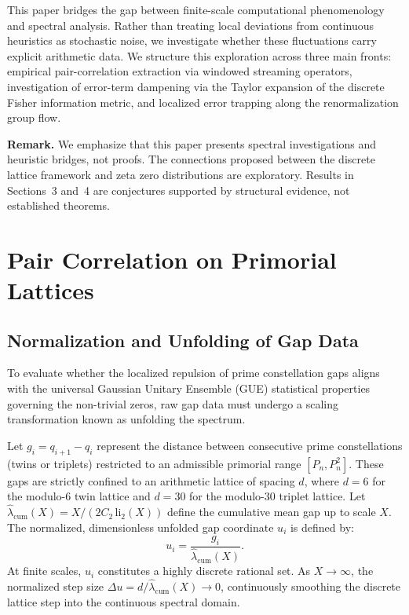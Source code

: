 \documentclass[11pt]{article}
\theoremstyle{remark}
\begin{document}
This paper bridges the gap between finite-scale computational phenomenology and spectral analysis. Rather than treating local deviations from continuous heuristics as stochastic noise, we investigate whether these fluctuations carry explicit arithmetic data. We structure this exploration across three main fronts: empirical pair-correlation extraction via windowed streaming operators, investigation of error-term dampening via the Taylor expansion of the discrete Fisher information metric, and localized error trapping along the renormalization group flow.

\noindent\textbf{Remark.} We emphasize that this paper presents spectral investigations and heuristic bridges, not proofs. The connections proposed between the discrete lattice framework and zeta zero distributions are exploratory. Results in Sections~3 and~4 are conjectures supported by structural evidence, not established theorems.

\section{Pair Correlation on Primorial Lattices}

\subsection{Normalization and Unfolding of Gap Data}
To evaluate whether the localized repulsion of prime constellation gaps aligns with the universal Gaussian Unitary Ensemble (GUE) statistical properties governing the non-trivial zeros, raw gap data must undergo a scaling transformation known as unfolding the spectrum.

Let $g_i = q_{i+1} - q_i$ represent the distance between consecutive prime constellations (twins or triplets) restricted to an admissible primorial range $[P_n, P_n^2]$. These gaps are strictly confined to an arithmetic lattice of spacing $d$, where $d=6$ for the modulo-6 twin lattice and $d=30$ for the modulo-30 triplet lattice. Let $\hat{\lambda}_{\mathrm{cum}}(X) = X / (2C_2\,\mathrm{li}_2(X))$ define the cumulative mean gap up to scale $X$. The normalized, dimensionless unfolded gap coordinate $u_i$ is defined by:
\begin{equation}
    u_i = \frac{g_i}{\hat{\lambda}_{\mathrm{cum}}(X)}.
\end{equation}
At finite scales, $u_i$ constitutes a highly discrete rational set. As $X \to \infty$, the normalized step size $\Delta u = d / \hat{\lambda}_{\mathrm{cum}}(X) \to 0$, continuously smoothing the discrete lattice step into the continuous spectral domain.
\end{document}
